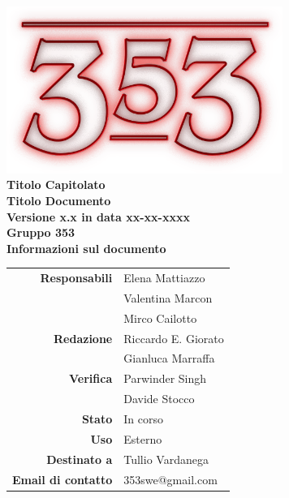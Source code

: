 \documentclass[openany, a4paper, 12pt]{report}
\begin{document}
\begin{titlepage}
	\centering
	\vfill
	{
		\bfseries
		\vskip2cm
		\includegraphics[width=9cm]{../../common/images/logo.png} \\
		\Large Titolo Capitolato\\
		\vfill
		\Huge Titolo Documento\\
		\Large Versione x.x in data xx-xx-xxxx\\
		\vfill
		\large Gruppo 353\\
		\vfill
	\normalsize Informazioni sul documento\\
\begin{table}[htbp]
	\centering
	\renewcommand\arraystretch{1.2}
	\begin{tabular}{r|l}
		\hline
		\textbf{Responsabili}	& Elena Mattiazzo\\
								& Valentina Marcon\\
								& Mirco Cailotto\\
		
		\textbf{Redazione} 		& Riccardo E. Giorato\\
								& Gianluca Marraffa\\
		
		\textbf{Verifica} 		& Parwinder Singh\\
								& Davide Stocco\\
						
		\textbf{Stato} 			& In corso\\
		\textbf{Uso}			& Esterno\\
		\textbf{Destinato a}   	& Tullio Vardanega\\
		
						
		\textbf{Email di contatto}	& 353swe@gmail.com
	\end{tabular}
\end{table}
		\vfill
	}    
\end{titlepage}

\tableofcontents
\newpage
{}
%
 
\end{document}
